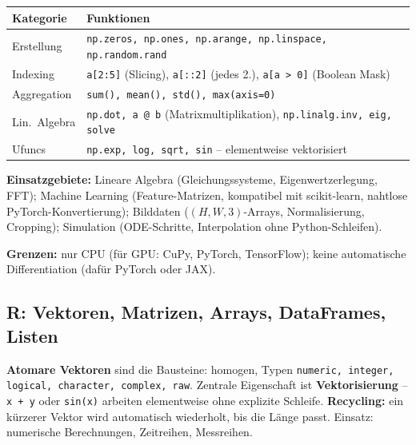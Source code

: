 \begin{table}[H]
  \centering
  \begin{tabularx}{\linewidth}{L{2.8cm} L{11.2cm}}
    \textbf{Kategorie} & \textbf{Funktionen} \\
    \midrule
    Erstellung & \texttt{np.zeros, np.ones, np.arange, np.linspace, np.random.rand} \\
    Indexing & \texttt{a[2:5]} (Slicing), \texttt{a[::2]} (jedes 2.), \texttt{a[a > 0]} (Boolean Mask) \\
    Aggregation & \texttt{sum(), mean(), std(), max(axis=0)} \\
    Lin.\ Algebra & \texttt{np.dot, a @ b} (Matrixmultiplikation), \texttt{np.linalg.inv, eig, solve} \\
    Ufuncs & \texttt{np.exp, log, sqrt, sin} -- elementweise vektorisiert \\
  \end{tabularx}
\end{table}

\textbf{Einsatzgebiete:} Lineare Algebra (Gleichungssysteme, Eigenwertzerlegung, FFT); Machine Learning (Feature-Matrizen, kompatibel mit scikit-learn, nahtlose PyTorch-Konvertierung); Bilddaten ($(H,W,3)$-Arrays, Normalisierung, Cropping); Simulation (ODE-Schritte, Interpolation ohne Python-Schleifen).

\textbf{Grenzen:} nur CPU (für GPU: CuPy, PyTorch, TensorFlow); keine automatische Differentiation (dafür PyTorch oder JAX).

\newpage

\subsection{R: Vektoren, Matrizen, Arrays, DataFrames, Listen}


\textbf{Atomare Vektoren} sind die Bausteine: homogen, Typen \texttt{numeric, integer, logical, character, complex, raw}. Zentrale Eigenschaft ist \textbf{Vektorisierung} -- \texttt{x + y} oder \texttt{sin(x)} arbeiten elementweise ohne explizite Schleife. \textbf{Recycling:} ein kürzerer Vektor wird automatisch wiederholt, bis die Länge passt. Einsatz: numerische Berechnungen, Zeitreihen, Messreihen.

